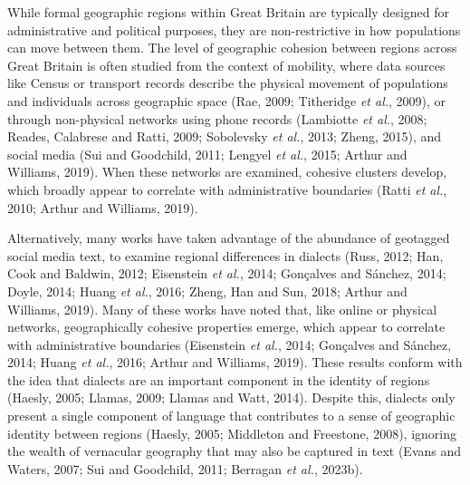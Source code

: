 \documentclass[
  letterpaper,
  11pt,
  english,
  onehalfspacing,
  headsepline]{MastersDoctoralThesis}
\begin{document}
While formal geographic regions within Great Britain are typically
designed for administrative and political purposes, they are
non-restrictive in how populations can move between them. The level of
geographic cohesion between regions across Great Britain is often
studied from the context of mobility, where data sources like Census or
transport records describe the physical movement of populations and
individuals across geographic space (Rae, 2009; Titheridge \emph{et
al.}, 2009), or through non-physical networks using phone records
(Lambiotte \emph{et al.}, 2008; Reades, Calabrese and Ratti, 2009;
Sobolevsky \emph{et al.}, 2013; Zheng, 2015), and social media (Sui and
Goodchild, 2011; Lengyel \emph{et al.}, 2015; Arthur and Williams,
2019). When these networks are examined, cohesive clusters develop,
which broadly appear to correlate with administrative boundaries (Ratti
\emph{et al.}, 2010; Arthur and Williams, 2019).

Alternatively, many works have taken advantage of the abundance of
geotagged social media text, to examine regional differences in dialects
(Russ, 2012; Han, Cook and Baldwin, 2012; Eisenstein \emph{et al.},
2014; Gonçalves and Sánchez, 2014; Doyle, 2014; Huang \emph{et al.},
2016; Zheng, Han and Sun, 2018; Arthur and Williams, 2019). Many of
these works have noted that, like online or physical networks,
geographically cohesive properties emerge, which appear to correlate
with administrative boundaries (Eisenstein \emph{et al.}, 2014;
Gonçalves and Sánchez, 2014; Huang \emph{et al.}, 2016; Arthur and
Williams, 2019). These results conform with the idea that dialects are
an important component in the identity of regions (Haesly, 2005; Llamas,
2009; Llamas and Watt, 2014). Despite this, dialects only present a
single component of language that contributes to a sense of geographic
identity between regions (Haesly, 2005; Middleton and Freestone, 2008),
ignoring the wealth of vernacular geography that may also be captured in
text (Evans and Waters, 2007; Sui and Goodchild, 2011; Berragan \emph{et
al.}, 2023b).
\end{document}

